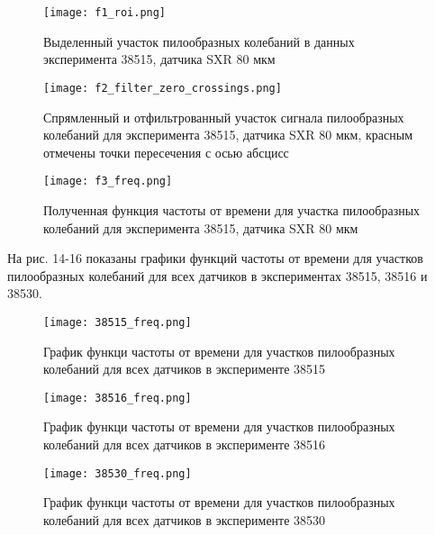 \documentclass{report}
\begin{document}
\begin{figure}[H]
     \centering
     \captionsetup{justification=centering}
     \texttt{[image: f1\_roi.png]}
     \caption{Выделенный участок пилообразных колебаний в данных эксперимента 38515, датчика SXR 80 мкм}\label{Fig:Data1}
\end{figure}
\begin{figure}[H]
     \centering
     \captionsetup{justification=centering}
     \texttt{[image: f2\_filter\_zero\_crossings.png]}
     \caption{Спрямленный и отфильтрованный участок сигнала пилообразных колебаний для эксперимента 38515, датчика SXR 80 мкм, красным отмечены точки пересечения с осью абсцисс}\label{Fig:Data1}
\end{figure}
\begin{figure}[H]
     \centering
     \captionsetup{justification=centering}
     \texttt{[image: f3\_freq.png]}
     \caption{Полученная функция частоты от времени для участка пилообразных колебаний для эксперимента 38515, датчика SXR 80 мкм}\label{Fig:Data1}
\end{figure}

\newpage

На рис. 14-16 показаны графики функций частоты от времени для участков пилообразных колебаний для всех датчиков в экспериментах 38515, 38516 и 38530.

\begin{figure}[H]
     \centering
     \captionsetup{justification=centering}
     \texttt{[image: 38515\_freq.png]}
     \caption{График функци частоты от времени для участков пилообразных колебаний для всех датчиков в эксперименте 38515}\label{Fig:Data1}
\end{figure}
\begin{figure}[H]
     \centering
     \captionsetup{justification=centering}
     \texttt{[image: 38516\_freq.png]}
     \caption{График функци частоты от времени для участков пилообразных колебаний для всех датчиков в эксперименте 38516}\label{Fig:Data1}
\end{figure}
\begin{figure}[H]
     \centering
     \captionsetup{justification=centering}
     \texttt{[image: 38530\_freq.png]}
     \caption{График функци частоты от времени для участков пилообразных колебаний для всех датчиков в эксперименте 38530}\label{Fig:Data1}
\end{figure}

\newpage
\end{document}
